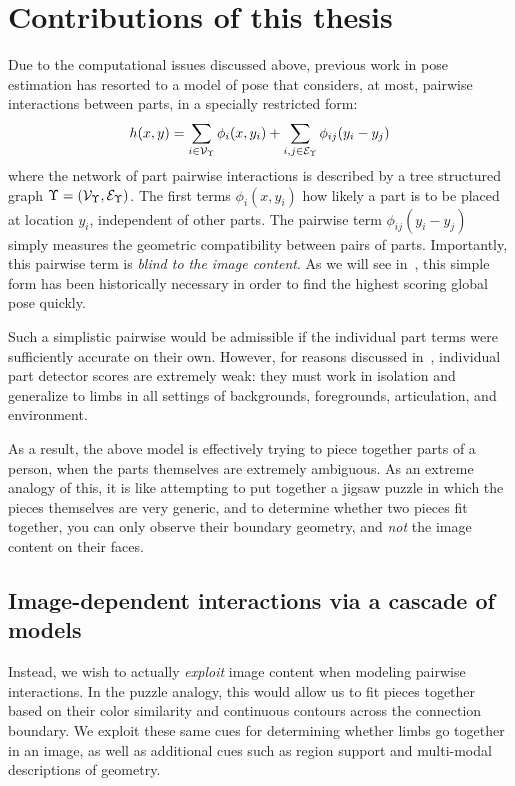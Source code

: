 
\section{Contributions of this thesis}

Due to the computational issues discussed above, previous work in pose 
estimation has resorted to a model of pose that considers, at most, pairwise 
interactions between parts, in a specially restricted form:
$$ h(x,y) =  \sum_{i \in \mathcal{V}_{\Upsilon}} \phi_i(x,y_i) + \sum_{i,j \in 
\mathcal{E}_{\Upsilon}} \phi_{ij}(y_i - y_j) $$
where the network of part pairwise interactions is described by a tree 
structured graph $\Upsilon = (\mathcal{V}_\Upsilon,\mathcal{E}_\Upsilon)$.  The first terms 
$\phi_i(x,y_i)$ how likely a part is to be placed at location $y_i$, 
independent of other parts.  The pairwise term $\phi_{ij}(y_i-y_j)$ simply 
measures the geometric compatibility between pairs of parts.  Importantly, this 
pairwise term is {\em blind to the image content}.  As we will see 
in~, this simple form has been historically necessary in order to 
find the highest scoring global pose quickly.

Such a simplistic pairwise would be admissible if the individual part terms 
were sufficiently accurate on their own.  However, for reasons discussed 
in~, individual part detector scores are extremely weak: 
they must work in isolation and generalize to limbs in all settings of 
backgrounds, foregrounds, articulation, and environment.

As a result, the above model is effectively trying to piece together parts of a 
person, when the parts themselves are extremely ambiguous. As an extreme 
analogy of this, it is like attempting to put together a jigsaw puzzle in which 
the pieces themselves are very generic, and to determine whether two pieces fit 
together, you can only observe their boundary geometry, and {\em not } the  
image content on their faces.


\subsection{Image-dependent interactions via a cascade of models}
Instead, we wish to actually {\em exploit } image content when modeling 
pairwise interactions.  In the puzzle analogy, this would allow us to fit 
pieces together based on their color similarity and continuous contours across 
the connection boundary.  We exploit these same cues for determining whether 
limbs go together in an image, as well as additional cues such as region 
support and multi-modal descriptions of geometry.


